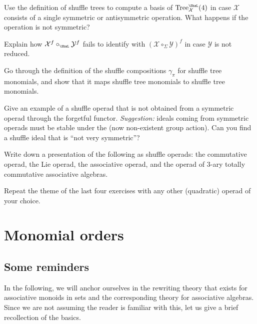 \documentclass[fleqn, a4paper, twoside]{article}
\newcommand{\Sha}{{\scaleobj{0.75}{\ShaL}}}
\newcommand{\0}{\langle 0\rangle}
\newcommand{\XX}{\mathcal{X}}
\newcommand{\YY}{\mathcal{Y}}
\DeclareRobustCommand{\[}{\begin{equation}}%
\DeclareRobustCommand{\]}{\end{equation}}%
\theoremstyle{mytheorem}
\theoremstyle{introthm}
\theoremstyle{mydefinition}
\theoremstyle{mydefinition2}
\theoremstyle{plain} %
\newcommand{\?}{\,?\,}
\theoremstyle{mytheorem}
\theoremstyle{plain} %
\begin{document}
\begin{question}
Use the definition of shuffle trees
to compute a basis
of $\mathrm{Tree}_\XX^\Sha(4)$ in case $\XX$ consists
of a single symmetric or antisymmetric
operation. What happens if the operation
is not symmetric?
\end{question}

\begin{question} Explain how 
$\XX^f \circ_\Sha \YY^f$ fails
 to identify with  $(\XX\circ_\Sigma \YY)^f$ 
 in case $\YY$ is
 not reduced. 
\end{question}

\begin{question}
Go through the definition of the shuffle
compositions $\gamma_\pi$ for shuffle
tree monomials, and show that it maps
shuffle tree monomials to shuffle tree
monomials.
\end{question}

\begin{question} 
Give an example of a shuffle operad that
is not obtained from a symmetric operad
through the forgetful functor. \emph{Suggestion:}
ideals coming from symmetric operads must be
stable under the (now non-existent group action).
Can you find a shuffle ideal that is ``not very
symmetric''?
\end{question}

\begin{question}
Write down a presentation of the following as
shuffle operads: the  
commutative operad, the
Lie operad, the
associative operad, and the
operad of $3$-ary totally commutative
associative algebras.
\end{question}

\begin{question}
Repeat the theme of the last four exercises
with any other (quadratic) operad
of your choice.
\end{question}

\newpage
\section{Monomial orders}


\subsection{Some reminders}

In the following, we will anchor ourselves in the 
rewriting theory that exists for associative monoids
in sets and the corresponding theory for
associative algebras. Since we are not assuming
the reader is familiar with this, let us give
a brief recollection of the basics.
\end{document}
